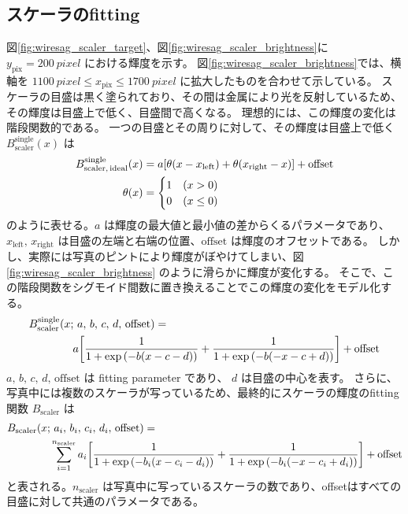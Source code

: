 \documentclass[../../main.tex]{subfiles}
\begin{document}
\subsection{スケーラのfitting}
図\ref{fig:wiresag_scaler_target}、図\ref{fig:wiresag_scaler_brightness}に
$y_{\mathrm{pix}}=\SI{200}{pixel}$ における輝度を示す。
図\ref{fig:wiresag_scaler_brightness}では、横軸を $\SI{1100}{pixel} \leq x_{\mathrm{pix}} \leq \SI{1700}{pixel}$
に拡大したものを合わせて示している。
スケーラの目盛は黒く塗られており、その間は金属により光を反射しているため、その輝度は目盛上で低く、目盛間で高くなる。
理想的には、この輝度の変化は階段関数的である。
一つの目盛とその周りに対して、その輝度は目盛上で低く $B_{\mathrm{scaler}}^{\mathrm{single}}(x)$ は
\begin{align}
    B_{\mathrm{scaler,\,ideal}}^{\mathrm{single}}(x) &= a\qty[\theta(x-x_{\mathrm{left}})+\theta(x_{\mathrm{right}}-x)] + \mathrm{offset} \\
    \theta(x) &= \begin{cases}
        1 & (x>0) \\
        0 & (x\leq 0)
    \end{cases}
\end{align}
のように表せる。$a$ は輝度の最大値と最小値の差からくるパラメータであり、$x_{\mathrm{left}},\,x_{\mathrm{right}}$ は目盛の左端と右端の位置、$\mathrm{offset}$ は輝度のオフセットである。
しかし、実際には写真のピントにより輝度がぼやけてしまい、図\ref{fig:wiresag_scaler_brightness} のように滑らかに輝度が変化する。
そこで、この階段関数をシグモイド間数に置き換えることでこの輝度の変化をモデル化する。
\begin{align}
    &B_{\mathrm{scaler}}^{\mathrm{single}}(x;\,a,\,b,\,c,\,d,\,\mathrm{offset}) = \notag \\
        &\qquad\qquad a\qty[\dfrac{1}{1+\exp\qty(-b\qty(x-c-d))} + \dfrac{1}{1+\exp\qty(-b\qty(-x-c+d))}] + \mathrm{offset}
\end{align}
$a,\,b,\,c,\,d,\,\mathrm{offset}$ は fitting parameter であり、 $d$ は目盛の中心を表す。
さらに、写真中には複数のスケーラが写っているため、最終的にスケーラの輝度のfitting関数 $B_{\mathrm{scaler}}$ は
\begin{align}
    &B_{\mathrm{scaler}}(x;\,a_i,\,b_i,\,c_i,\,d_i,\,\text{offset}) = \notag\\
    &\qquad\qquad\sum_{i=1}^{n_{\mathrm{scaler}}} a_i\qty[\dfrac{1}{1+\exp\qty(-b_i\qty(x-c_i-d_i))} + \dfrac{1}{1+\exp\qty(-b_i\qty(-x-c_i+d_i))}] + \mathrm{offset}
\end{align}
と表される。$n_{\mathrm{scaler}}$ は写真中に写っているスケーラの数であり、offsetはすべての目盛に対して共通のパラメータである。
\end{document}
